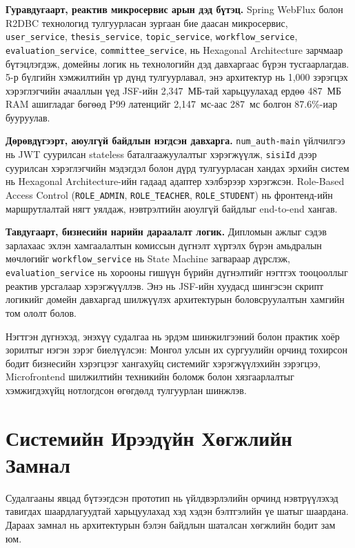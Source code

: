 \textbf{Гуравдугаарт, реактив микросервис арын дэд бүтэц.}
Spring WebFlux болон R2DBC технологид тулгуурласан зургаан бие даасан
микросервис, \texttt{user\_service}, \texttt{thesis\_service},
\texttt{topic\_service}, \texttt{workflow\_service},
\texttt{evaluation\_service}, \texttt{committee\_service}, нь Hexagonal
Architecture зарчмаар бүтэцлэгдэж, домейны логик нь технологийн дэд
давхаргаас бүрэн тусгаарлагдав. 5-р бүлгийн хэмжилтийн үр дүнд
тулгуурлавал, энэ архитектур нь 1,000 зэрэгцэх хэрэглэгчийн ачааллын
үед JSF-ийн 2,347~МБ-тай харьцуулахад ердөө 487~МБ RAM ашигладаг бөгөөд
P99 латенцийг 2,147~мс-аас 287~мс болгон 87.6\%-иар бууруулав.

\textbf{Дөрөвдүгээрт, аюулгүй байдлын нэгдсэн давхарга.}
\texttt{num\_auth-main} үйлчилгээ нь JWT суурилсан stateless баталгаажуулалтыг
хэрэгжүүлж, \texttt{sisiId} дээр суурилсан хэрэглэгчийн мэдэгдэл болон
дүрд тулгуурласан хандах эрхийн систем нь Hexagonal Architecture-ийн гадаад
адаптер хэлбэрээр хэрэгжсэн. Role-Based Access Control
(\texttt{ROLE\_ADMIN}, \texttt{ROLE\_TEACHER}, \texttt{ROLE\_STUDENT}) нь
фронтенд-ийн маршрутлалтай нягт уялдаж, нэвтрэлтийн аюулгүй байдлыг
end-to-end хангав.

\textbf{Тавдугаарт, бизнесийн нарийн дараалалт логик.} Дипломын ажлыг
сэдэв зарлахаас эхлэн хамгаалалтын комиссын дүгнэлт хүртэлх бүрэн
амьдралын мөчлөгийг \texttt{workflow\_service} нь State Machine загвараар
дүрслэж, \texttt{evaluation\_service} нь хорооны гишүүн бүрийн дүгнэлтийг
нэгтгэх тооцооллыг реактив урсгалаар хэрэгжүүллэв. Энэ нь JSF-ийн
хуудасд шингэсэн скрипт логикийг домейн давхаргад шилжүүлэх архитектурын
боловсруулалтын хамгийн том ололт болов.

Нэгтгэн дүгнэхэд, энэхүү судалгаа нь эрдэм шинжилгээний болон практик
хоёр зорилтыг нэгэн зэрэг биелүүлсэн: Монгол улсын их сургуулийн орчинд
тохирсон бодит бизнесийн хэрэгцээг хангахуйц системийг хэрэгжүүлэхийн
зэрэгцээ, Microfrontend шилжилтийн техникийн боломж болон хязгаарлалтыг
хэмжигдэхүйц нотлогдсон өгөгдөлд тулгуурлан шинжлэв.

\section{Системийн Ирээдүйн Хөгжлийн Замнал}

Судалгааны явцад бүтээгдсэн прототип нь үйлдвэрлэлийн орчинд нэвтрүүлэхэд
тавигдах шаардлагуудтай харьцуулахад хэд хэдэн бэлтгэлийн үе шатыг
шаардана. Дараах замнал нь архитектурын бэлэн байдлын шаталсан хөгжлийн
бодит зам юм.

